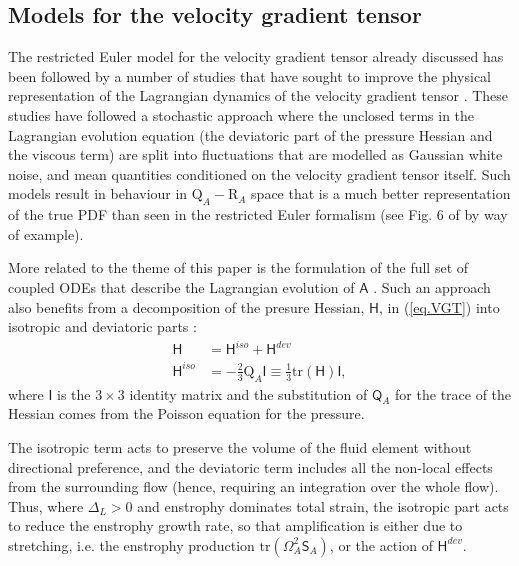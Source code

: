 \documentclass[preprint,amssymb,amsmath,aip,cha]{revtex4-1}
\begin{document}
\subsection{Models for the velocity gradient tensor}
\label{sect.VGTmodels}
The restricted Euler model for the velocity gradient tensor already discussed \citep{cantwell92} has been followed by a number of studies that have sought to improve the physical representation of the Lagrangian dynamics of the velocity gradient tensor \citep{pope90, martin98, chevillard08, wilczek14, johnson16}. These studies have followed a stochastic approach where the unclosed terms in the Lagrangian evolution equation (the deviatoric part of the pressure Hessian and the viscous term) are split into fluctuations that are modelled as Gaussian white noise, and mean quantities conditioned on the velocity gradient tensor itself. Such models result in behaviour in $\mbox{Q}_{A} - \mbox{R}_{A}$ space that is a much better representation of the true PDF than seen in the restricted Euler formalism (see Fig. 6 of \citet{johnson16} by way of example).

More related to the theme of this paper is the formulation of the full set of coupled ODEs that describe the Lagrangian evolution of $\mathsf{A}$ \citep{martin98,nomurapost98}. Such an approach also benefits from a decomposition of the presure Hessian, $\mathsf{H}$, in (\ref{eq.VGT}) into isotropic and deviatoric parts \citep{ohkitani95}:
\begin{align}
\mathsf{H} &= \mathsf{H}^{iso} + \mathsf{H}^{dev}\nonumber \\ 
\mathsf{H}^{iso} &= -\frac{2}{3}\mbox{Q}_{A}\mathsf{I} \equiv  \frac{1}{3}\mbox{tr}(\mathsf{H})\mathsf{I},
\label{eq.Hessian}
\end{align}
where $\mathsf{I}$ is the $3 \times 3$ identity matrix and the substitution of $\mathsf{Q}_{A}$ for the trace of the Hessian comes from the Poisson equation for the pressure. 

The isotropic term acts to preserve the volume of the fluid element without directional preference, and the deviatoric term includes all the non-local effects from the surrounding flow (hence, requiring an integration over the whole flow). Thus, where $\Delta_{L} > 0$ and enstrophy dominates total strain, the isotropic part acts to reduce the enstrophy growth rate, so that amplification is either due to stretching, i.e. the enstrophy production $\mbox{tr}(\mathsf{\Omega}_{A}^{2}\mathsf{S}_{A})$, or the action of $\mathsf{H}^{dev}$.
\end{document}
